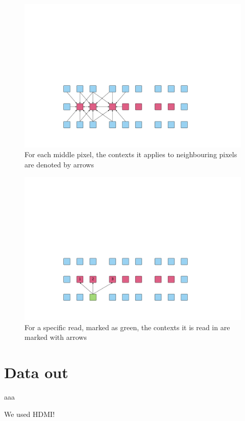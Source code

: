 \begin{figure}[h!]
    \includegraphics[width=\linewidth]{img/Contexts.png}
    \caption{For each middle pixel, the contexts it applies to neighbouring pixels are denoted by arrows}
    \label{fig:Contexts}
\end{figure}

\begin{figure}[h!]
    \includegraphics[width=\linewidth]{img/Contexts2.png}
    \caption{For a specific read, marked as green, the contexts it is read in are marked with arrows}
    \label{fig:Contexts}
\end{figure}
\section{Data out}

aaa

We used HDMI!

